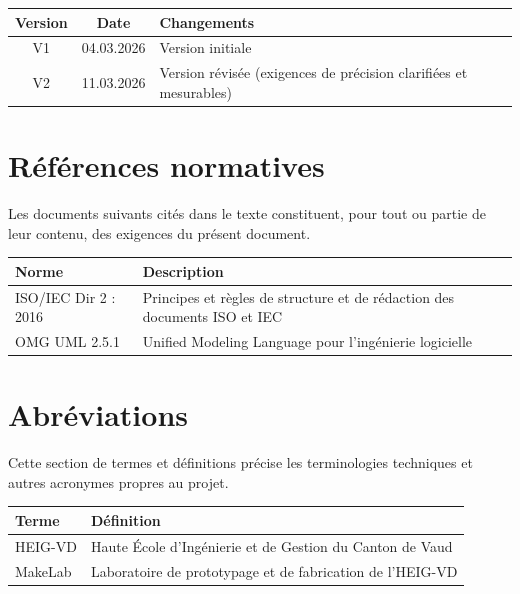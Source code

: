 \documentclass[11pt,a4paper]{report}
\begin{document}
\begin{center}
\begin{tabularx}{0.8\textwidth}{c c X}
\toprule
\textbf{Version} & \textbf{Date} & \textbf{Changements} \\
\midrule
V1 & 04.03.2026 & Version initiale \\
V2 & 11.03.2026 & Version révisée (exigences de précision clarifiées et mesurables) \\
\bottomrule
\end{tabularx}
\end{center}


\section*{Références normatives}

Les documents suivants cités dans le texte constituent, pour tout ou partie de leur contenu, des exigences du présent document.

\begin{center}
\begin{tabularx}{\textwidth}{l X}
\toprule
\textbf{Norme} & \textbf{Description} \\
\midrule
ISO/IEC Dir 2 : 2016 & Principes et règles de structure et de rédaction des documents ISO et IEC \\
OMG UML 2.5.1 & Unified Modeling Language pour l’ingénierie logicielle \\
\bottomrule
\end{tabularx}
\end{center}


\section*{Abréviations}

Cette section de termes et définitions précise les terminologies techniques et autres acronymes propres au projet.

\begin{center}
\begin{tabularx}{0.7\textwidth}{l X}
\toprule
\textbf{Terme} & \textbf{Définition} \\
\midrule
HEIG-VD & Haute École d’Ingénierie et de Gestion du Canton de Vaud \\
MakeLab & Laboratoire de prototypage et de fabrication de l'HEIG-VD \\
\bottomrule
\end{tabularx}
\end{center}
\end{document}
